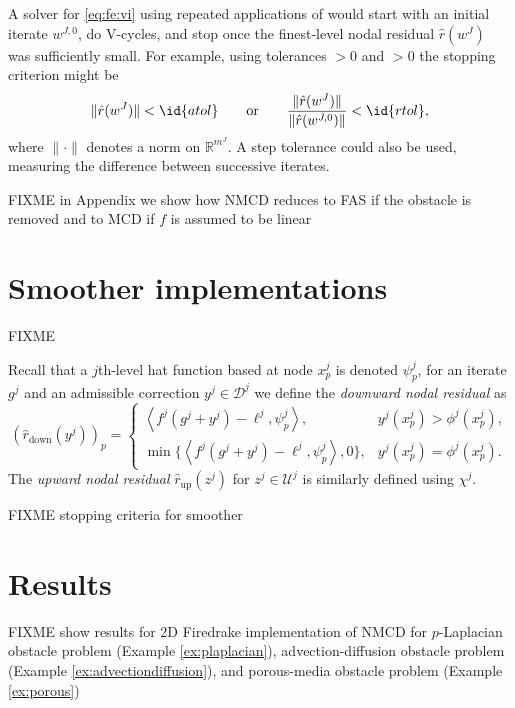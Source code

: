 \documentclass[letterpaper,final,12pt,reqno]{amsart}
\theoremstyle{cstyle}
\theoremstyle{cstyle*}
\theoremstyle{dstyle}
\numberwithin{equation}{section}
\numberwithin{figure}{section}
\numberwithin{table}{section}
\numberwithin{theorem}{section}
\newcommand{\RR}{\mathbb{R}}
\newcommand{\ip}[2]{\left<#1,#2\right>}
\begin{document}
A solver for \eqref{eq:fe:vi} using repeated applications of  would start with an initial iterate $w^{J,0}$, do V-cycles, and stop once the finest-level nodal residual $\hat r(w^J)$ was sufficiently small.  For example, using tolerances $>0$ and $>0$ the stopping criterion might be
\begin{equation}
\|\hat r(w^J)\| < \id{atol} \qquad \text{or} \qquad \frac{\|\hat r(w^J)\|}{\|\hat r(w^{J,0})\|} < \id{rtol},
\end{equation}
where $\|\cdot\|$ denotes a norm on $\RR^{m^J}$.  A step tolerance could also be used, measuring the difference between successive iterates.

FIXME in Appendix we show how NMCD reduces to FAS if the obstacle is removed and to MCD if $f$ is assumed to be linear



\section{Smoother implementations} \label{sec:smoothers}

FIXME

Recall that a $j$th-level hat function based at node $x_p^j$ is denoted $\psi_p^j$, for an iterate $g^j$ and an admissible correction $y^j \in \mathcal{D}^j$ we define the \emph{downward nodal residual} as
\begin{equation}
(\hat r_{\text{down}}(y^j))_p = \begin{cases} \ip{f^j(g^j+y^j)-\ell^j}{\psi_p^j}, & y^j(x_p^j) > \phi^j(x_p^j), \\
                                  \min\{\ip{f^j(g^j+y^j)-\ell^j}{\psi_p^j},0\}, & y^j(x_p^j) = \phi^j(x_p^j). \end{cases} \label{eq:dncpresidual}
\end{equation}
The \emph{upward nodal residual} $\hat r_{\text{up}}(z^j)$ for $z^j \in \mathcal{U}^j$ is similarly defined using $\chi^j$.

FIXME stopping criteria for smoother


\section{Results} \label{sec:results}

FIXME show results for 2D Firedrake implementation of NMCD for $p$-Laplacian obstacle problem (Example \ref{ex:plaplacian}), advection-diffusion obstacle problem (Example \ref{ex:advectiondiffusion}), and porous-media obstacle problem (Example \ref{ex:porous})
\end{document}
